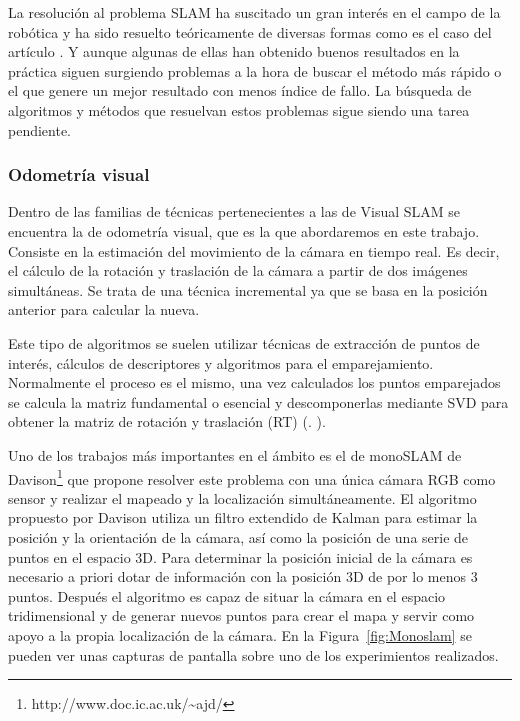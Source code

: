 La resolución al problema SLAM ha suscitado un gran interés en el campo de la robótica y ha sido resuelto teóricamente de diversas formas como es el caso del artículo \parencite{Reference1}. Y aunque algunas de ellas han obtenido buenos resultados en la práctica siguen surgiendo problemas a la hora de buscar el método más rápido o el que genere un mejor resultado con menos índice de fallo. La búsqueda de algoritmos y métodos que resuelvan estos problemas sigue siendo una tarea pendiente.

\subsubsection{Odometría visual}

Dentro de las familias de técnicas pertenecientes a las de Visual SLAM se encuentra la de odometría visual, que es la que abordaremos en este trabajo. Consiste en la estimación del movimiento de la cámara en tiempo real. Es decir, el cálculo de la rotación y traslación de la cámara a partir de dos imágenes simultáneas. Se trata de una técnica incremental ya que se basa en la posición anterior para calcular la nueva.

Este tipo de algoritmos se suelen utilizar técnicas de extracción de puntos de interés, cálculos de descriptores y algoritmos para el emparejamiento. Normalmente el proceso es el mismo, una vez calculados los puntos emparejados se calcula la matriz fundamental o esencial y descomponerlas mediante SVD para obtener la matriz de rotación y traslación (RT) (\cite{Reference3}. \cite{Reference4}).

Uno de los trabajos más importantes en el ámbito es el de monoSLAM de Davison\footnote{http://www.doc.ic.ac.uk/\textasciitilde ajd/} \parencite{Reference5} que propone resolver este problema con una única cámara RGB como sensor y realizar el mapeado y la localización simultáneamente. El algoritmo propuesto por Davison utiliza un filtro extendido de Kalman para estimar la posición y la orientación de la cámara, así como la posición de una serie de puntos en el espacio 3D. Para determinar la posición inicial de la cámara es necesario a priori dotar de información con la posición 3D de por lo menos 3 puntos. Después el algoritmo es capaz de situar la cámara en el espacio tridimensional y de generar nuevos puntos para crear el mapa y servir como apoyo a la propia localización de la cámara. En la Figura~\ref{fig:Monoslam} se pueden ver unas capturas de pantalla sobre uno de los experimientos realizados.

